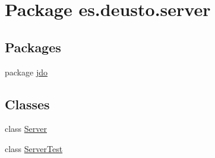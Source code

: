\hypertarget{namespacees_1_1deusto_1_1server}{}\section{Package es.\+deusto.\+server}
\label{namespacees_1_1deusto_1_1server}
\subsection*{Packages}
\begin{DoxyCompactItemize}
\item 
package \hyperlink{namespacees_1_1deusto_1_1server_1_1jdo}{jdo}
\end{DoxyCompactItemize}
\subsection*{Classes}
\begin{DoxyCompactItemize}
\item 
class \hyperlink{classes_1_1deusto_1_1server_1_1_server}{Server}
\item 
class \hyperlink{classes_1_1deusto_1_1server_1_1_server_test}{Server\+Test}
\end{DoxyCompactItemize}

